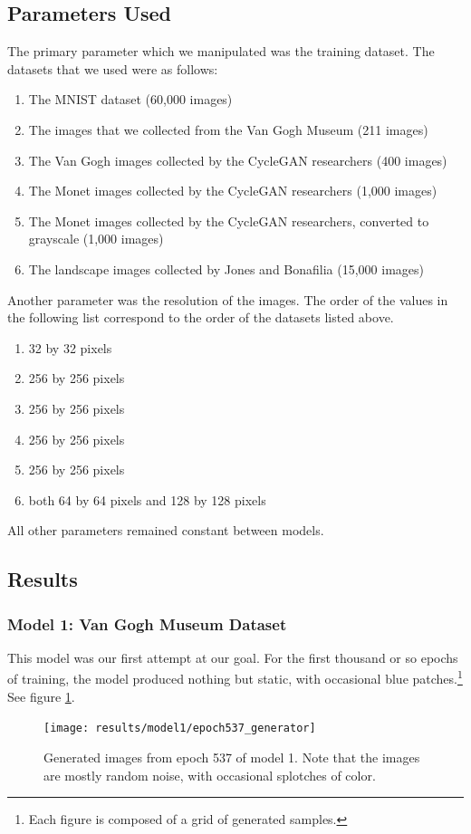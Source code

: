 \documentclass[11pt,letterpaper]{article}
\begin{document}
		\subsection{Parameters Used}
			The primary parameter which we manipulated was the training dataset.
			The datasets that we used were as follows:
			\begin{enumerate}
				\item The MNIST dataset (60,000 images)
				\item The images that we collected from the Van Gogh Museum (211 images)
				\item The Van Gogh images collected by the CycleGAN researchers (400 images)
				\item The Monet images collected by the CycleGAN researchers (1,000 images)
				\item The Monet images collected by the CycleGAN researchers, converted to grayscale (1,000 images)
				\item The landscape images collected by Jones and Bonafilia\cite{otherGanGogh} (15,000 images)
			\end{enumerate}
			Another parameter was the resolution of the images.
			The order of the values in the following list correspond to the order of the datasets listed above.
			\begin{enumerate}
				\item 32 by 32 pixels
				\item 256 by 256 pixels
				\item 256 by 256 pixels
				\item 256 by 256 pixels
				\item 256 by 256 pixels
				\item both 64 by 64 pixels and 128 by 128 pixels  %
			\end{enumerate}
			All other parameters remained constant between models.
		\subsection{Results}
			\subsubsection{Model 1: Van Gogh Museum Dataset}
				This model was our first attempt at our goal.
				For the first thousand or so epochs of training, the model produced nothing but static, with occasional blue patches.\footnote{Each figure is composed of a grid of generated samples.}
				See figure \ref{fig:vgm:epoch537generator}.
				\begin{figure}
					\centering
					\texttt{[image: results/model1/epoch537\_generator]}
					\caption[Van Gogh Museum dataset, epoch 537]{Generated images from epoch 537 of model 1. Note that the images are mostly random noise, with occasional splotches of color.}
					\label{fig:vgm:epoch537generator}
				\end{figure}
\end{document}
